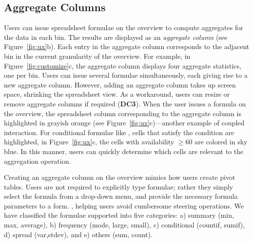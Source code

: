 \subsection{Aggregate Columns}
Users can issue spreadsheet formulae
on the overview
to compute aggregates for the data
in each bin.
The results
are displayed as an {\em aggregate column} (see Figure~\ref{fig:ux}b). Each entry in the aggregate column
corresponds to the adjacent bin
in the current granularity
of the overview.
For example, in Figure~\ref{fig:customize}c,
the aggregate column displays
four aggregate statistics,
one per bin.
Users can issue several formulae simultaneously,
each giving rise to a new aggregate column.
However, adding an aggregate column
takes up screen space, shrinking the spreadsheet view.
As a workaround, users can resize or
remove aggregate columns if required (\textbf{DC3}).
When the user issues a formula on the overview,
the spreadsheet column
corresponding to the aggregate column
is highlighted in grayish orange
(see Figure~\ref{fig:ux}c)---another example of coupled interaction.
For conditional formulae like ,
cells that satisfy the condition
are highlighted, \eg in Figure~\ref{fig:ux}c,
the cells with availability $\ge 60$ are colored in sky blue.
In this manner,
users can quickly determine which cells
are relevant to the aggregation operation.

Creating an aggregate column on the overview mimics how users create pivot tables. Users
are not required to explicitly type formulae;
rather they simply select the formula from a drop-down menu,
and provide the necessary formula parameters to a form.
,
helping users avoid cumbersome steering operations.
We have classified the formulae supported
into five categories: a) summary (\eg min, max, average),
b) frequency (\eg mode, large, small), c) conditional (\eg countif, sumif), d) spread (\eg var,stdev), and e) others (\eg sum, count).


